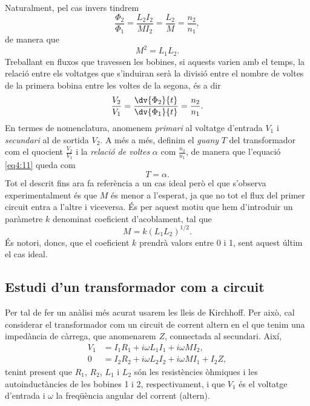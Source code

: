 \documentclass[a4paper,10.5pt]{report}
\begin{document}
Naturalment, pel cas invers tindrem
\begin{equation}
	\frac{\Phi_2}{\Phi_1}=\frac{L_2I_2}{MI_2}=\frac{L_2}{M}=\frac{n_2}{n_1}, \label{eq:4:9}
\end{equation}
de manera que
\begin{equation}
	M^2=L_1L_2. \label{eq:4:10}
\end{equation}
Treballant en fluxos que travessen les bobines, si aquests varien amb el temps, la relació entre els voltatges que s'induiran serà la divisió entre el nombre de voltes de la primera bobina entre les voltes de la segona, és a dir
\begin{equation}
	\frac{V_2}{V_1}=\frac{\dv{\Phi_2}{t}}{\dv{\Phi_1}{t}}=\frac{n_2}{n_1}. \label{eq4:11}
\end{equation}
En termes de nomenclatura, anomenem \textit{primari} al voltatge d'entrada $V_1$ i \textit{secundari} al de sortida $V_2$. A més a més, definim el \textit{guany}  $T$ del transformador com el quocient $\frac{V_2}{V_1}$ i la \textit{relació de voltes} $\alpha$ com $\frac{n_2}{n_1}$, de manera que l'equació \eqref{eq4:11} queda com
\begin{equation}
	T = \alpha. \label{eq:4.transf}
\end{equation}
Tot el descrit fins ara fa referència a un cas ideal però el que s'observa experimentalment és que $M$ és menor a l'esperat, ja que no tot el flux del primer circuit entra a l'altre i viceversa. És per aquest motiu que hem d'introduir un paràmetre $k$ denominat coeficient d'acoblament, tal que
\begin{equation}
	M=k(L_1L_2)^{1/2}. \label{eq4:12}
\end{equation}
És notori, doncs, que el coeficient $k$ prendrà valors entre 0 i 1, sent aquest últim el cas ideal.

\subsection{Estudi d'un transformador com a circuit}
Per tal de fer un anàlisi més acurat usarem les lleis de Kirchhoff. Per això, cal considerar el transformador com un circuit de corrent altern en el que tenim una impedància de càrrega, que anomenarem $Z$, connectada al secundari. Així,
\begin{align}
	V_1 &= I_1 R_1 + i \omega L_1 I_1 + i \omega M I_2 \label{eq4:13},\\
	0 & = I_2 R_2 + i \omega L_2 I_2 + i \omega M I_1 + I_2 Z \label{eq4:14},
\end{align}
tenint present que $R_1$, $R_2$, $L_1$ i $L_2$ són les resistències òhmiques i les autoinductàncies de les bobines 1 i 2, respectivament, i que $V_1$ és el voltatge d'entrada i $\omega$ la freqüència angular del corrent (altern).
\end{document}
